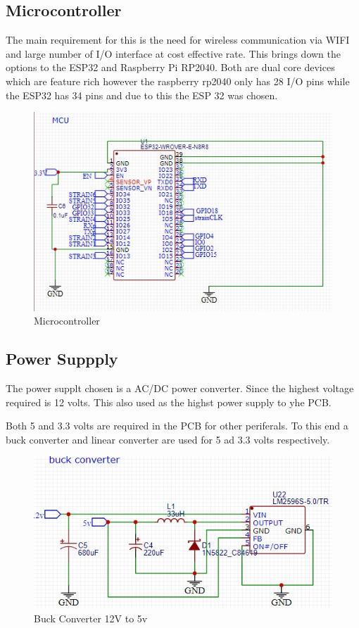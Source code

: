 \subsection{Microcontroller}
The main requirement for this is the need for wireless communication via WIFI and large number of I/O interface at cost effective rate. This brings down the options to the ESP32 and Raspberry Pi RP2040. Both are dual core devices which are feature rich however the raspberry rp2040 only has 28 I/O pins while the ESP32 has 34 pins and due to this the ESP 32 was chosen. 
\begin{center}
	\begin{figure}[!h]
	\centering
	\includegraphics{Figures/mcu}
	\caption[Microcotroller]{Microcontroller}
	\end{figure}
\end{center}

\subsection{Power Suppply}
The power supplt chosen is a AC/DC power converter. Since the highest voltage required is 12 volts. This also used as the highst power supply to yhe PCB.

Both 5 and 3.3 volts are required in the PCB for other periferals. To this end a buck converter and linear converter are used for 5 ad 3.3 volts respectively.

\begin{center}
	\begin{figure}[!h]
	\centering
	\includegraphics{Figures/buck}
	\caption[Buck converter]{Buck Converter 12V to 5v}
	\end{figure}
\end{center}

